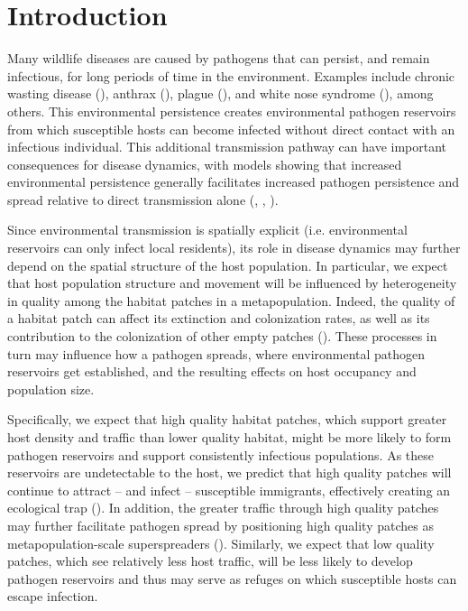 \documentclass{article}
\begin{document}
\section{Introduction}
\label{intro}

Many wildlife diseases are caused by pathogens that can persist, and remain infectious, for long periods of time in the environment.  Examples include chronic wasting disease (\cite{Miller2006}), anthrax (\cite{Dragon1995}), plague (\cite{Eisen2008}), and white nose syndrome (\cite{Lindner2011}), among others.  This environmental persistence creates environmental pathogen reservoirs from which susceptible hosts can become infected without direct contact with an infectious individual.  This additional transmission pathway can have important consequences for disease dynamics, with models showing that increased environmental persistence generally facilitates increased pathogen persistence and spread relative to direct transmission alone (\cite{Almberg2011}, \cite{Sharp2011}, \cite{Breban2009}). 

Since environmental transmission is spatially explicit (i.e. environmental reservoirs can only infect local residents), its role in disease dynamics may further depend on the spatial structure of the host population.  In particular, we expect that host population structure and movement will be influenced by heterogeneity in quality among the habitat patches in a metapopulation.  Indeed, the quality of a habitat patch can affect its extinction and colonization rates, as well as its contribution to the colonization of other empty patches (\cite{Moilanen1998}).  These processes in turn may influence how a pathogen spreads, where environmental pathogen reservoirs get established, and the resulting effects on host occupancy and population size.  

Specifically, we expect that high quality habitat patches, which support greater host density and traffic than lower quality habitat, might be more likely to form pathogen reservoirs and support consistently infectious populations.  As these reservoirs are undetectable to the host, we predict that high quality patches will continue to attract -- and infect -- susceptible immigrants, effectively creating an ecological trap (\cite{Almberg2011}).  In addition, the greater traffic through high quality patches may further facilitate pathogen spread by positioning high quality patches as metapopulation-scale superspreaders (\cite{Paull2012}).  Similarly, we expect that low quality patches, which see relatively less host traffic, will be less likely to develop pathogen reservoirs and thus may serve as refuges on which susceptible hosts can escape infection.  
\end{document}
